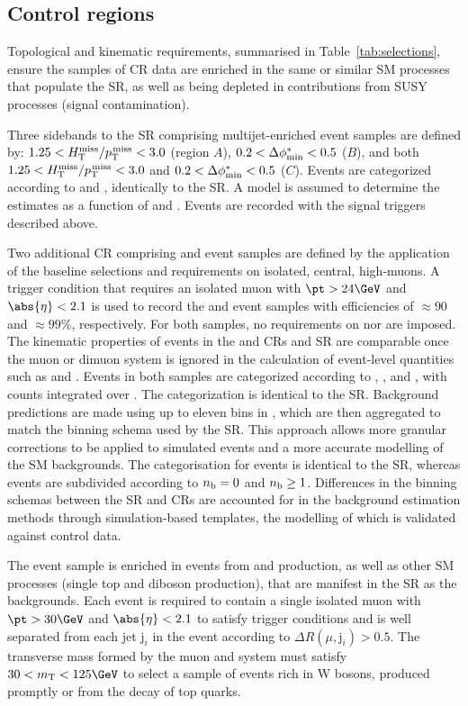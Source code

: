 \subsection{Control regions}
\label{sec:control}

Topological and kinematic requirements, summarised in
Table~\ref{tab:selections}, ensure the samples of CR data are enriched
in the same or similar SM processes that populate the SR, as well as
being depleted in contributions from SUSY processes (signal
contamination).

Three sidebands to the SR comprising multijet-enriched event samples
are defined by: $1.25 < H_{\text{T}}^{\text{miss}} / p_{\text{T}}^{\kern1pt\text{miss}} < 3.0$ (region $A$), $0.2 < \Delta\phi^{*}_\text{min} <
0.5$ ($B$), and both $1.25 < H_{\text{T}}^{\text{miss}} / p_{\text{T}}^{\kern1pt\text{miss}} < 3.0$ and $0.2 < \Delta\phi^{*}_\text{min} < 0.5$
($C$). Events are categorized according to \njet and \scalht,
identically to the SR. A model is assumed to determine the estimates
as a function of \nb and \mht. Events are recorded with the signal
triggers described above.

Two additional CR comprising \mj and \mmj event samples are defined by
the application of the baseline selections and requirements on
isolated, central, high-\pt muons. A trigger condition that requires
an isolated muon with $\pt > 24\GeV$ and $\abs{\eta} < 2.1$ is used to
record the \mj and \mmj event samples with efficiencies of
${\approx}90$ and ${\approx}99\%$, respectively. For both samples, no
requirements on \alphat nor \bdphi are imposed. The kinematic
properties of events in the \mj and \mmj CRs and SR are comparable
once the muon or dimuon system is ignored in the calculation of
event-level quantities such as \scalht and \mht.  Events in both
samples are categorized according to \njet, \scalht, and \nb, with
counts integrated over \mht. The \njet categorization is identical to
the SR. Background predictions are made using up to eleven bins in
\scalht, which are then aggregated to match the \scalht binning schema
used by the SR. This approach allows more granular corrections to be
applied to simulated events and a more accurate modelling of the SM
backgrounds. The \nb categorisation for \mj events is identical to the
SR, whereas \mmj events are subdivided according to $n_{\text{b}} = 0$ and $n_{\text{b}}
\geq 1$. Differences in the binning schemas between the SR and CRs are
accounted for in the background estimation methods through
simulation-based templates, the modelling of which is validated
against control data.

The \mj event sample is enriched in events from \wmj and \ttbar
production, as well as other SM processes (\eg single top and diboson
production), that are manifest in the SR as the \lost
backgrounds. Each event is required to contain a single isolated muon
with $\pt > 30\GeV$ and $\abs{\eta} < 2.1$ to satisfy trigger
conditions and is well separated from each jet $\text{j}_i$ in the
event according to ${\Delta}R(\mu,\text{j}_i) > 0.5$. The transverse
mass formed by the muon \pt and \ptvecmiss system must satisfy $30 <
m_\text{T} < 125\GeV$ to select a sample of events rich in W bosons,
produced promptly or from the decay of top quarks.

